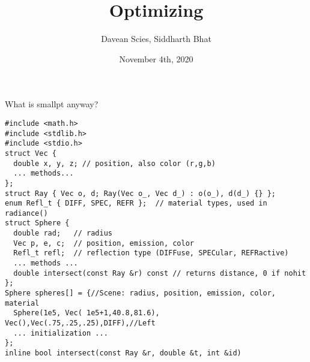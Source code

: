 \documentclass[8pt]{beamer}
\author{Davean Scies, Siddharth Bhat}
\date{November 4th, 2020}
\institute{Haskell Exchange}
\title{Optimizing \smallpt}
\begin{document}
\maketitle

\begin{frame}[fragile]{What is smallpt anyway?}
\begin{verbatim}
#include <math.h>
#include <stdlib.h>
#include <stdio.h>
struct Vec {      
  double x, y, z; // position, also color (r,g,b) 
  ... methods...
}; 
struct Ray { Vec o, d; Ray(Vec o_, Vec d_) : o(o_), d(d_) {} }; 
enum Refl_t { DIFF, SPEC, REFR };  // material types, used in radiance() 
struct Sphere { 
  double rad;   // radius 
  Vec p, e, c;  // position, emission, color 
  Refl_t refl;  // reflection type (DIFFuse, SPECular, REFRactive) 
  ... methods ...
  double intersect(const Ray &r) const // returns distance, 0 if nohit 
}; 
Sphere spheres[] = {//Scene: radius, position, emission, color, material 
  Sphere(1e5, Vec( 1e5+1,40.8,81.6), Vec(),Vec(.75,.25,.25),DIFF),//Left 
  ... initialization ...
}; 
inline bool intersect(const Ray &r, double &t, int &id) 
\end{verbatim}
\end{frame}
\end{document}
